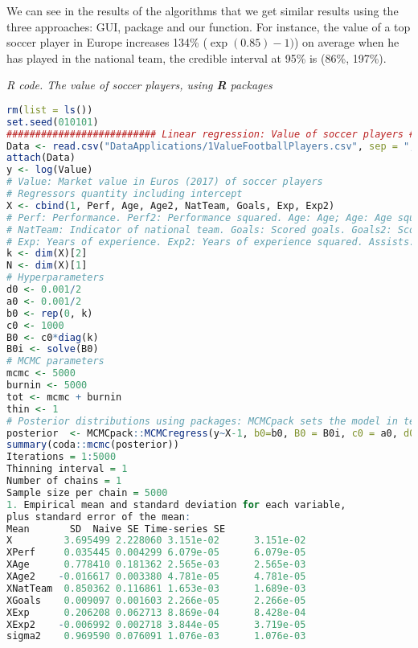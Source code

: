 We can see in the results of the algorithms that we get similar results using the three approaches: GUI, package and our function. For instance, the value of a top soccer player in Europe increases 134\% ($\exp(0.85)-1)$) on average when he has played in the national team, the credible interval at 95\% is (86\%, 197\%).  


\begin{tcolorbox}[enhanced,width=4.67in,center upper,
	fontupper=\large\bfseries,drop shadow southwest,sharp corners]
	\textit{R code. The value of soccer players, using \textbf{R} packages}
	\begin{VF}
		\begin{lstlisting}[language=R]		
rm(list = ls())
set.seed(010101)
########################## Linear regression: Value of soccer players ##########################
Data <- read.csv("DataApplications/1ValueFootballPlayers.csv", sep = ",", header = TRUE, fileEncoding = "latin1")
attach(Data)
y <- log(Value) 
# Value: Market value in Euros (2017) of soccer players
# Regressors quantity including intercept
X <- cbind(1, Perf, Age, Age2, NatTeam, Goals, Exp, Exp2)
# Perf: Performance. Perf2: Performance squared. Age: Age; Age: Age squared. 
# NatTeam: Indicator of national team. Goals: Scored goals. Goals2: Scored goals squared
# Exp: Years of experience. Exp2: Years of experience squared. Assists: Number of assists
k <- dim(X)[2]
N <- dim(X)[1]
# Hyperparameters
d0 <- 0.001/2
a0 <- 0.001/2
b0 <- rep(0, k)
c0 <- 1000
B0 <- c0*diag(k)
B0i <- solve(B0)
# MCMC parameters
mcmc <- 5000
burnin <- 5000
tot <- mcmc + burnin
thin <- 1
# Posterior distributions using packages: MCMCpack sets the model in terms of the precision matrix
posterior  <- MCMCpack::MCMCregress(y~X-1, b0=b0, B0 = B0i, c0 = a0, d0 = d0, burnin = burnin, mcmc = mcmc, thin = thin)
summary(coda::mcmc(posterior))
Iterations = 1:5000
Thinning interval = 1 
Number of chains = 1 
Sample size per chain = 5000 
1. Empirical mean and standard deviation for each variable,
plus standard error of the mean:
Mean       SD  Naive SE Time-series SE
X         3.695499 2.228060 3.151e-02      3.151e-02
XPerf     0.035445 0.004299 6.079e-05      6.079e-05
XAge      0.778410 0.181362 2.565e-03      2.565e-03
XAge2    -0.016617 0.003380 4.781e-05      4.781e-05
XNatTeam  0.850362 0.116861 1.653e-03      1.689e-03
XGoals    0.009097 0.001603 2.266e-05      2.266e-05
XExp      0.206208 0.062713 8.869e-04      8.428e-04
XExp2    -0.006992 0.002718 3.844e-05      3.719e-05
sigma2    0.969590 0.076091 1.076e-03      1.076e-03
\end{lstlisting}
	\end{VF}
\end{tcolorbox} 

